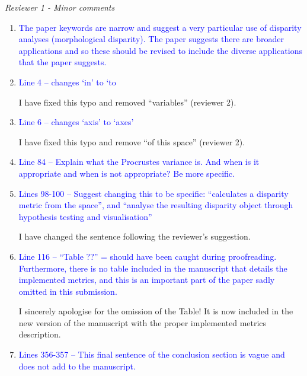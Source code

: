 \documentclass[12pt,letterpaper]{article}
\renewcommand{\subsection}[1]{%
\bigskip
\begin{center}
\begin{large}
\normalfont\itshape #1
\end{large}
\end{center}}
\begin{document}
\subsection{Reviewer 1 - Minor comments}

\begin{enumerate}

\item{\textcolor{blue}{The paper keywords are narrow and suggest a very particular use of disparity analyses (morphological disparity). The paper suggests there are broader applications and so these should be revised to include the diverse applications that the paper suggests. }}


\item{\textcolor{blue}{Line 4 – changes ‘in’ to ‘to}}

I have fixed this typo and removed ``variables'' (reviewer 2).

\item{\textcolor{blue}{Line 6 – changes ‘axis’ to ‘axes’}}

I have fixed this typo and remove ``of this space'' (reviewer 2).

\item{\textcolor{blue}{Line 84 – Explain what the Procrustes variance is. And when is it appropriate and when is not appropriate? Be more specific.}}


\item{\textcolor{blue}{Lines 98-100 – Suggest changing this to be specific: “calculates a disparity metric from the space”, and “analyse the resulting disparity object through hypothesis testing and visualisation”}}

I have changed the sentence following the reviewer's suggestion.

\item{\textcolor{blue}{Line 116 – “Table ??” = should have been caught during proofreading. Furthermore, there is no table included in the manuscript that details the implemented metrics, and this is an important part of the paper sadly omitted in this submission.}}

I sincerely apologise for the omission of the Table! It is now included in the new version of the manuscript with the proper implemented metrics description.

\item{\textcolor{blue}{Lines 356-357 – This final sentence of the conclusion section is vague and does not add to the manuscript.}}


\end{enumerate}
\end{document}
